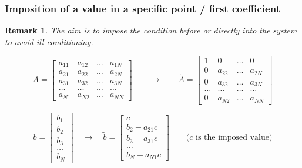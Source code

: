 \documentclass[9pt]{beamer}
\newtheorem*{remark}{Remark}
\begin{document}
\begin{frame}
\frametitle{Imposition of a value in a specific point / first coefficient}
\begin{remark}
	The aim is to impose the condition before or directly into the system to avoid ill-conditioning.
\end{remark}

\begin{equation*}
A=\begin{bmatrix}
a_{11} & a_{12} & \dots & a_{1N} \\ 
a_{21} & a_{22} & \dots & a_{2N} \\ 
a_{31} &a_{32} & \dots & a_{3N} \\
\dots & \dots & \dots & \dots \\
a_{N1}  & a_{N2} & \dots & a_{NN}
\end{bmatrix} \quad \quad \rightarrow
\quad \quad \tilde{A}=\begin{bmatrix}
1 & 0 & \dots & 0 \\ 
0 & a_{22} & \dots & a_{2N} \\ 
0 &a_{32} & \dots & a_{3N} \\
\dots & \dots & \dots & \dots \\
0  & a_{N2} & \dots & a_{NN}
\end{bmatrix}
\end{equation*}

\begin{equation*}
b=\begin{bmatrix}
b_1 \\ b_2 \\ b_3 \\ \dots \\ b_N
\end{bmatrix} \quad \rightarrow \quad
\tilde{b}=\begin{bmatrix}
c \\ b_2 -a_{21}c \\ b_3-a_{31}c \\ \dots \\ b_N-a_{N1}c
\end{bmatrix}
\quad \quad \text{($c$ is the imposed value)}
\end{equation*}
\end{frame}
\end{document}
